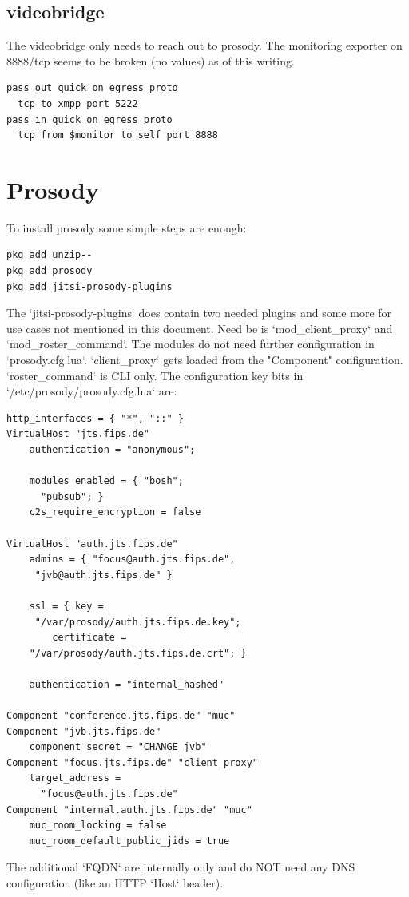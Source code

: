 \documentclass[conference]{IEEEtran}
\begin{document}
\subsection{videobridge}
The videobridge only needs to reach out to prosody. The monitoring exporter on 8888/tcp
seems to be broken (no values) as of this writing.
\begin{verbatim}
pass out quick on egress proto
  tcp to xmpp port 5222
pass in quick on egress proto
  tcp from $monitor to self port 8888
\end{verbatim}

\section{Prosody}
To install prosody some simple steps are enough:
\begin{verbatim}
pkg_add unzip--
pkg_add prosody
pkg_add jitsi-prosody-plugins
\end{verbatim}
The `jitsi-prosody-plugins` does contain two needed plugins and some more for use
cases not mentioned in this document. Need be is `mod_client_proxy` and `mod_roster_command`.
The modules do not need further configuration in `prosody.cfg.lua`.
`client_proxy` gets loaded from the "Component" configuration. `roster_command` is CLI only.
The configuration key bits in `/etc/prosody/prosody.cfg.lua` are:
\begin{verbatim}
http_interfaces = { "*", "::" }
VirtualHost "jts.fips.de"
    authentication = "anonymous";

    modules_enabled = { "bosh";
      "pubsub"; }
    c2s_require_encryption = false

VirtualHost "auth.jts.fips.de"
    admins = { "focus@auth.jts.fips.de",
     "jvb@auth.jts.fips.de" }

    ssl = { key =
     "/var/prosody/auth.jts.fips.de.key";
        certificate =
    "/var/prosody/auth.jts.fips.de.crt"; }

    authentication = "internal_hashed"
    
Component "conference.jts.fips.de" "muc"
Component "jvb.jts.fips.de"
    component_secret = "CHANGE_jvb"
Component "focus.jts.fips.de" "client_proxy"
    target_address = 
      "focus@auth.jts.fips.de"
Component "internal.auth.jts.fips.de" "muc"
    muc_room_locking = false
    muc_room_default_public_jids = true
\end{verbatim}
The additional `FQDN` are internally only and
do NOT need any DNS configuration (like an
HTTP `Host` header).
\end{document}
